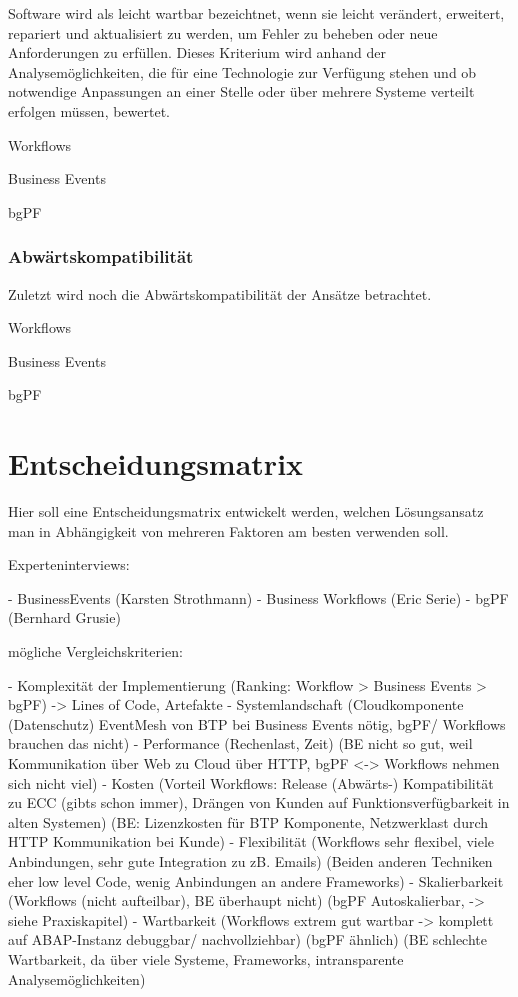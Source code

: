 Software wird als leicht wartbar bezeichtnet, wenn sie leicht verändert, erweitert, repariert und aktualisiert zu werden, um Fehler zu beheben oder neue Anforderungen zu erfüllen. Dieses Kriterium wird anhand der Analysemöglichkeiten, die für eine Technologie zur Verfügung stehen und ob notwendige Anpassungen an einer Stelle oder über mehrere Systeme verteilt erfolgen müssen, bewertet.

Workflows

Business Events

bgPF

\subsubsection{Abwärtskompatibilität}

Zuletzt wird noch die Abwärtskompatibilität der Ansätze betrachtet. 

Workflows

Business Events

bgPF

\section{Entscheidungsmatrix}

Hier soll eine Entscheidungsmatrix entwickelt werden, welchen Lösungsansatz man in Abhängigkeit von mehreren Faktoren am besten verwenden soll. \newline

Experteninterviews:

- BusinessEvents (Karsten Strothmann) \newline
- Business Workflows (Eric Serie) \newline
- bgPF (Bernhard Grusie)

mögliche Vergleichskriterien:

- Komplexität der Implementierung (Ranking: Workflow > Business Events > bgPF) -> Lines of Code, Artefakte \newline
- Systemlandschaft (Cloudkomponente (Datenschutz) EventMesh von BTP bei Business Events nötig, bgPF/ Workflows brauchen das nicht) \newline
- Performance (Rechenlast, Zeit) (BE nicht so gut, weil Kommunikation über Web zu Cloud über HTTP, bgPF <-> Workflows nehmen sich nicht viel) \newline
- Kosten (Vorteil Workflows: Release (Abwärts-) Kompatibilität zu ECC (gibts schon immer), Drängen von Kunden auf Funktionsverfügbarkeit in alten Systemen) (BE: Lizenzkosten für BTP Komponente, Netzwerklast durch HTTP Kommunikation bei Kunde) \newline
- Flexibilität (Workflows sehr flexibel, viele Anbindungen, sehr gute Integration zu zB. Emails) (Beiden anderen Techniken eher low level Code, wenig Anbindungen an andere Frameworks) \newline
- Skalierbarkeit (Workflows (nicht aufteilbar), BE überhaupt nicht) (bgPF Autoskalierbar, -> siehe Praxiskapitel) \newline
- Wartbarkeit (Workflows extrem gut wartbar -> komplett auf ABAP-Instanz debuggbar/ nachvollziehbar) (bgPF ähnlich) (BE schlechte Wartbarkeit, da über viele Systeme, Frameworks, intransparente Analysemöglichkeiten)